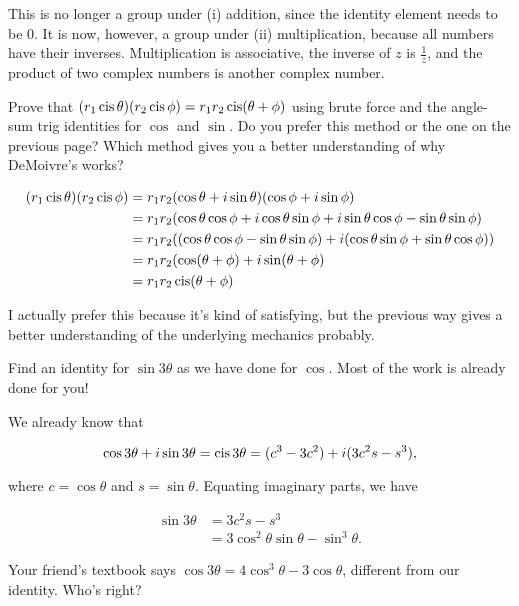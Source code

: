 \documentclass[../key.tex]{subfiles}
\begin{document}
This is no longer a group under (i) addition, since the identity element needs to be $0$. It is now, however, a group under (ii) multiplication, because all numbers have their inverses. Multiplication is associative, the inverse of $z$ is $\frac{1}{z}$, and the product of two complex numbers is another complex number.

\begin{outer_problem}
\item Prove that $(r_1\operatorname{cis} \theta)(r_2\operatorname{cis} \phi) = r_1r_2 \operatorname{cis}(\theta + \phi)$ using brute force and the angle-sum trig identities for $\cos$ and $\sin$. Do you prefer this method or the one on the previous page? Which method gives you a better understanding of why DeMoivre's works?
\end{outer_problem}

\begin{align*}
(r_1\operatorname{cis} \theta)(r_2\operatorname{cis} \phi) &= r_1r_2(\cos \theta + i\sin \theta)(\cos \phi + i\sin \phi) \\
&= r_1r_2(\cos\theta\cos\phi + i\cos\theta\sin\phi + i\sin\theta\cos\phi - \sin\theta\sin\phi) \\
&= r_1r_2((\cos\theta\cos\phi - \sin\theta\sin\phi) + i(\cos\theta\sin\phi+\sin\theta\cos\phi)) \\
&= r_1r_2(\cos(\theta+\phi) + i\sin(\theta + \phi) \\
&= r_1r_2\operatorname{cis}(\theta + \phi)
\end{align*}

I actually prefer this because it's kind of satisfying, but the previous way gives a better understanding of the underlying mechanics probably.

\begin{outer_problem}
\item Find an identity for $\sin 3\theta$ as we have done for $\cos$. Most of the work is already done for you!
\end{outer_problem}

We already know that

$$\cos 3\theta + i\sin 3\theta = \operatorname{cis} 3\theta = (c^3 - 3c^2) + i (3c^2 s - s^3),$$

where $c=\cos\theta$ and $s=\sin\theta$. Equating imaginary parts, we have

\begin{align*}
\sin 3\theta &= 3c^2 s - s^3 \\
&= 3\cos^2\theta\sin\theta - \sin^3\theta.
\end{align*}

\begin{outer_problem}
\item Your friend's textbook says $\cos 3\theta = 4\cos^3\theta - 3\cos \theta$, different from our identity. Who's right?
\end{outer_problem}
\end{document}
